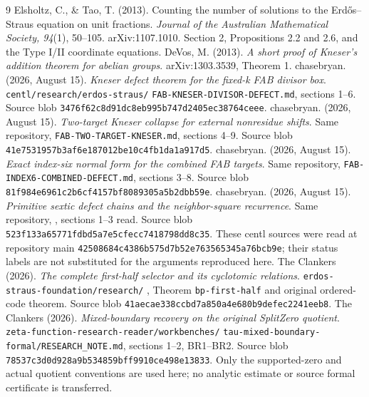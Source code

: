 \begin{thebibliography}{9}
 Elsholtz, C., \& Tao, T. (2013). Counting the number of solutions
to the Erd\H{o}s--Straus equation on unit fractions. \emph{Journal of the
Australian Mathematical Society, 94}(1), 50--105. arXiv:1107.1010.
Section 2, Propositions 2.2 and 2.6, and the Type I/II coordinate equations.
 DeVos, M. (2013). \emph{A short proof of Kneser's addition theorem
for abelian groups}. arXiv:1303.3539, Theorem 1.
 chasebryan. (2026, August 15). \emph{Kneser defect theorem
for the fixed-k FAB divisor box}. \texttt{centl/research/erdos-straus/}
\texttt{FAB-KNESER-DIVISOR-DEFECT.md}, sections 1--6.
Source blob \texttt{3476f62c8d91dc8eb995b747d2405ec38764ceee}.
 chasebryan. (2026, August 15). \emph{Two-target Kneser collapse
for external nonresidue shifts}. Same repository,
\texttt{FAB-TWO-TARGET-KNESER.md}, sections 4--9.
Source blob \texttt{41e7531957b3af6e187012be10c4fb1da1a917d5}.
 chasebryan. (2026, August 15). \emph{Exact index-six normal form
for the combined FAB targets}. Same repository,
\texttt{FAB-INDEX6-COMBINED-DEFECT.md}, sections 3--8.
Source blob \texttt{81f984e6961c2b6cf4157bf8089305a5b2dbb59e}.
 chasebryan. (2026, August 15). \emph{Primitive sextic defect
chains and the neighbor-square recurrence}. Same repository,
, sections 1--3 read.
Source blob \texttt{523f133a65771fdbd5a7e5cfecc7418798dd8c35}.
These centl sources were read at repository main
\texttt{42508684c4386b575d7b52e763565345a76bcb9e}; their status labels are not
substituted for the arguments reproduced here.
 The Clankers (2026). \emph{The complete first-half selector and
its cyclotomic relations}. \texttt{erdos-straus-foundation/research/}
,
Theorem \texttt{bp-first-half} and original ordered-code theorem.
Source blob \texttt{41aecae338ccbd7a850a4e680b9defec2241eeb8}.
 The Clankers (2026). \emph{Mixed-boundary recovery on the
original SplitZero quotient}. \texttt{zeta-function-research-reader/workbenches/}
\texttt{tau-mixed-boundary-formal/RESEARCH\_NOTE.md}, sections 1--2, BR1--BR2.
Source blob \texttt{78537c3d0d928a9b534859bff9910ce498e13833}.
Only the supported-zero and actual quotient conventions are used here;
no analytic estimate or source formal certificate is transferred.
\end{thebibliography}
